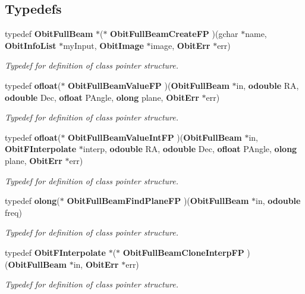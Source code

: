 \subsection*{Typedefs}
\begin{CompactItemize}
\item 
typedef {\bf Obit\-Full\-Beam} $\ast$($\ast$ {\bf Obit\-Full\-Beam\-Create\-FP} )(gchar $\ast$name, {\bf Obit\-Info\-List} $\ast$my\-Input, {\bf Obit\-Image} $\ast$image, {\bf Obit\-Err} $\ast$err)
\begin{CompactList}\small\item\em Typedef for definition of class pointer structure. \item\end{CompactList}\item 
typedef {\bf ofloat}($\ast$ {\bf Obit\-Full\-Beam\-Value\-FP} )({\bf Obit\-Full\-Beam} $\ast$in, {\bf odouble} RA, {\bf odouble} Dec, {\bf ofloat} PAngle, {\bf olong} plane, {\bf Obit\-Err} $\ast$err)
\begin{CompactList}\small\item\em Typedef for definition of class pointer structure. \item\end{CompactList}\item 
typedef {\bf ofloat}($\ast$ {\bf Obit\-Full\-Beam\-Value\-Int\-FP} )({\bf Obit\-Full\-Beam} $\ast$in, {\bf Obit\-FInterpolate} $\ast$interp, {\bf odouble} RA, {\bf odouble} Dec, {\bf ofloat} PAngle, {\bf olong} plane, {\bf Obit\-Err} $\ast$err)
\begin{CompactList}\small\item\em Typedef for definition of class pointer structure. \item\end{CompactList}\item 
typedef {\bf olong}($\ast$ {\bf Obit\-Full\-Beam\-Find\-Plane\-FP} )({\bf Obit\-Full\-Beam} $\ast$in, {\bf odouble} freq)
\begin{CompactList}\small\item\em Typedef for definition of class pointer structure. \item\end{CompactList}\item 
typedef {\bf Obit\-FInterpolate} $\ast$($\ast$ {\bf Obit\-Full\-Beam\-Clone\-Interp\-FP} )({\bf Obit\-Full\-Beam} $\ast$in, {\bf Obit\-Err} $\ast$err)
\begin{CompactList}\small\item\em Typedef for definition of class pointer structure. \item\end{CompactList}\end{CompactItemize}
